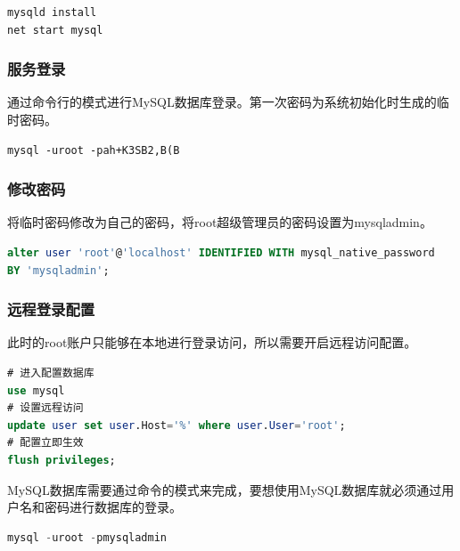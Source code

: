\documentclass[12pt, openany, oneside]{book}
\begin{document}
\begin{lstlisting}
mysqld install
net start mysql
\end{lstlisting}

\subsubsection{服务登录}

通过命令行的模式进行MySQL数据库登录。第一次密码为系统初始化时生成的临时密码。\\


\begin{lstlisting}
mysql -uroot -pah+K3SB2,B(B
\end{lstlisting}

\subsubsection{修改密码}

将临时密码修改为自己的密码，将root超级管理员的密码设置为mysqladmin。\\


\begin{lstlisting}[language=SQL]
alter user 'root'@'localhost' IDENTIFIED WITH mysql_native_password
BY 'mysqladmin';
\end{lstlisting}

\subsubsection{远程登录配置}

此时的root账户只能够在本地进行登录访问，所以需要开启远程访问配置。\\


\begin{lstlisting}[language=SQL]
# 进入配置数据库
use mysql
# 设置远程访问
update user set user.Host='%' where user.User='root';
# 配置立即生效
flush privileges;
\end{lstlisting}

MySQL数据库需要通过命令的模式来完成，要想使用MySQL数据库就必须通过用户名和密码进行数据库的登录。\\


\begin{lstlisting}[language=SQL]
mysql -uroot -pmysqladmin
\end{lstlisting}
\end{document}
